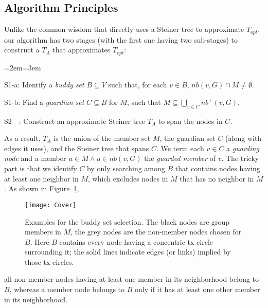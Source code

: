 \documentclass[10pt, conference, compsocconf]{IEEEtran}
\begin{document}
  \subsection{Algorithm Principles} \label{sec:principle}
Unlike the common wisdom that directly uses a Steiner tree to approximate $T_{\mathit{opt}}$, our algorithm has two stages (with the first one having two sub-stages) to construct a $T_A$ that approximates $T_\mathit{opt}$:
\begin{list}{}{\itemindent=-1.5em}{\listparindent=2em}{=3em}\item[S1-a:] Identify a \textit{buddy set} $B \subseteq V$ such that, for each $v \in B$, $\mathit{nb}(v, G) \cap M \not= \emptyset$.
\item[S1-b:] Find a \textit{guardian set} $C \subseteq B$ for $M$, such that $M\subseteq \bigcup_{v\in C}\mathit{nb}^+(v,G)$.
\item[S2~~:] Construct an approximate Steiner tree $T_A$ to span the nodes in $C$.
\end{list}
As a result, $T_A$ is the union of the member set $M$, the guardian set $C$ (along with edges it uses), and the Steiner tree that spans $C$. We term each $v \in C$ a \textit{guarding node} and a member $u \in M \wedge u \in \mathit{nb}(v, G)$ the \textit{guarded member} of $v$. The tricky part is that we identify $C$ by only searching among $B$ that contains nodes having at least one neighbor in $M$, which excludes nodes in $M$ that has no neighbor in $M$. As shown in Figure~\ref{fig:cover},
\begin{figure}[htbp]
      \centerline{\texttt{[image: Cover]}}
      \caption{Examples for the buddy set selection. The black nodes are group members in $M$, the grey nodes are the non-member nodes chosen for $B$. Here $B$ contains every node having a concentric tx circle surrounding it; the solid lines indicate edges (or links) implied by those tx circles.}
      \label{fig:cover}
    \end{figure}
all non-member nodes having at least one member in its neighborhood belong to $B$, whereas a member node belongs to $B$ only if it has at least one other member in its neighborhood.
\end{document}
